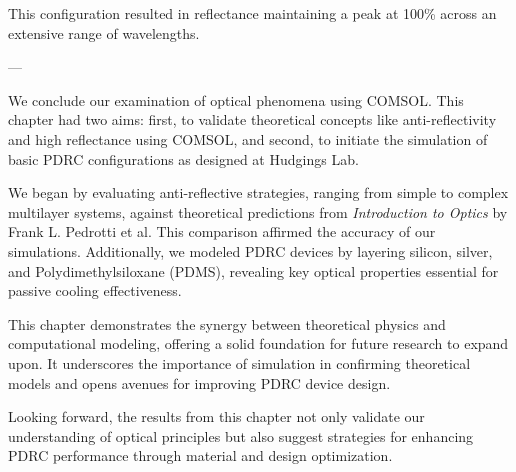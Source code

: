 This configuration resulted in reflectance maintaining a peak at 100\% across an extensive range of wavelengths.

---

We conclude our examination of optical phenomena using COMSOL. This chapter had two aims: first, to validate theoretical concepts like anti-reflectivity and high reflectance using COMSOL, and second, to initiate the simulation of basic PDRC configurations as designed at Hudgings Lab.

We began by evaluating anti-reflective strategies, ranging from simple to complex multilayer systems, against theoretical predictions from \emph{Introduction to Optics} by Frank L. Pedrotti et al. This comparison affirmed the accuracy of our simulations. Additionally, we modeled PDRC devices by layering silicon, silver, and Polydimethylsiloxane (PDMS), revealing key optical properties essential for passive cooling effectiveness.

This chapter demonstrates the synergy between theoretical physics and computational modeling, offering a solid foundation for future research to expand upon. It underscores the importance of simulation in confirming theoretical models and opens avenues for improving PDRC device design.

Looking forward, the results from this chapter not only validate our understanding of optical principles but also suggest strategies for enhancing PDRC performance through material and design optimization.